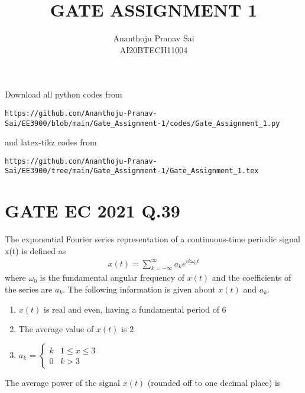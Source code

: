\documentclass[journal,12pt,twocolumn]{IEEEtran}
\begin{document}
     \def\centbox#1{\makebox[0in]{#1}}
     \def\topbox#1{\raisebox{-\baselineskip}[0in][0in]{#1}}
     \def\midbox#1{\raisebox{-0.5\baselineskip}[0in][0in]{#1}}
\vspace{3cm}
\title{GATE ASSIGNMENT 1}
\author{Ananthoju Pranav Sai \\ AI20BTECH11004}
\maketitle
\newpage
\bigskip
\renewcommand{\thefigure}{\theenumi}
\renewcommand{\thetable}{\theenumi}
Download all python codes from 
\begin{lstlisting}
https://github.com/Ananthoju-Pranav-Sai/EE3900/blob/main/Gate_Assignment-1/codes/Gate_Assignment_1.py
\end{lstlisting}
%
and latex-tikz codes from 
%
\begin{lstlisting}
https://github.com/Ananthoju-Pranav-Sai/EE3900/tree/main/Gate_Assignment-1/Gate_Assignment_1.tex
\end{lstlisting}
%
\section{GATE EC 2021 Q.39}
The exponential Fourier series representation of a continuous-time periodic signal x(t) is defined as 
\begin{align}
    x(t) = \sum_{k=-\infty}^{\infty}a_{k}e^{ik\omega_0t}
\end{align}
where $\omega_0$ is the fundamental angular frequency of $x(t)$ and the coefficients of the series are $a_k$. The following information is given about $x(t)$ and $a_k$.
\begin{enumerate}[label=\Roman*]
    \item $x(t)$ is real and even, having a fundamental period of 6
    \item The average value of $x(t)$ is 2
    \item $a_k$ = $\begin{cases} 
                    k & 1\leq x\leq 3\\
                    0 & k>3
                  \end{cases}$

\end{enumerate}
The average power of the signal $x(t)$ (rounded off to one decimal place) is
\end{document}
